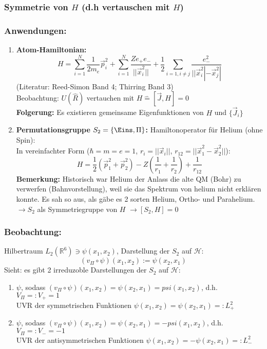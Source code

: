 \documentclass[twoside,a4paper]{scrartcl}
\newcommand{\R}{\mathbb{R}}
\renewcommand{\1}{\mathds{1}}
\newcommand{\ra}{\rightarrow}
\renewcommand{\H}{\mathcal{H}}
\renewcommand{\R}{\mathbb{R}}
\begin{document}
\subsubsection*{Symmetrie von $H$ (d.h vertauschen mit $H$)}
\subsubsection*{Anwendungen:}
\begin{enumerate}
\item \textbf{Atom-Hamiltonian:}\\
$$H=\sum_{i=1}^N \frac{1}{2m_e} \vec p_i^2+\sum_{i=1}^N \frac{Z e_+e_-}{||\vec x_i^2||}+\frac{1}{2} \sum_{i=1, i \neq j} \frac{e_-^2}{||\vec x_i^2|-\vec x_j^2|}$$
(Literatur: Reed-Simon Band 4; Thirring Band 3)\\
Beobachtung: $U(\hat R)$ vertauchen mit $H \mathrel{\widehat{=}} [\vec J,H]=0$\\
\textbf{Folgerung:} Es existieren gemeinsame Eigenfunktionen von $H$ und $\{\vec J_i\}$\\
\item \textbf{Permutationsgruppe $S_2=\{\Eins, \Pi\}$:} Hamiltonoperator für Helium (ohne Spin):\\
In vereinfachter Form ($\hbar=m=e=1$, $r_i=||\vec x_i||$, $r_{12}=||\vec x_1^2-\vec x_2^2||$): $$H=\frac{1}{2}(\vec p_1^2+\vec p_2^2)-Z(\frac{1}{r_1}+\frac{1}{r_2})+\frac{1}{r_{12}}$$
\textbf{Bemerkung:} Historisch war Helium der Anlass die alte QM (Bohr) zu verwerfen (Bahnvorstellung), weil sie das Spektrum von helium nicht erklären  konnte. Es sah so aus, als gäbe es 2 sorten Helium, Ortho- und Parahelium.\\
$\ra S_2$ als Symmetriegruppe von $H$ $\ra [S_2,H]=0$ \\
\end{enumerate}
\subsubsection*{Beobachtung:}
Hilbertraum $L_2(\R^6) \ni \psi(x_1,x_2)$, Darstellung der $S_2$ auf $\H$:
$$(v_\Pi \circ \psi)(x_1,x_2):=\psi(x_2,x_1)$$
Sieht: es gibt 2 irreduzoble Darstellungen der $S_2$ auf $\H$:
\begin{enumerate}
\item $\psi$, sodass $(v_\Pi\circ \psi)(x_1,x_2)=\psi(x_2,x_1)=psi(x_1,x_2)$, d.h. $V_\Pi=:V_+=1$\\
UVR der symmetrischen Funktionen $\psi(x_1,x_2)=\psi(x_2,x_1)=:L_+^2$
\item $\psi$, sodass $(v_\Pi\circ \psi)(x_1,x_2)=\psi(x_2,x_1)=-psi(x_1,x_2)$, d.h. $V_\Pi=:V_-=-1$\\
UVR der antisymmetrischen Funktionen $\psi(x_1,x_2)=-\psi(x_2,x_1)=:L_-^2$
\end{enumerate}
\end{document}
